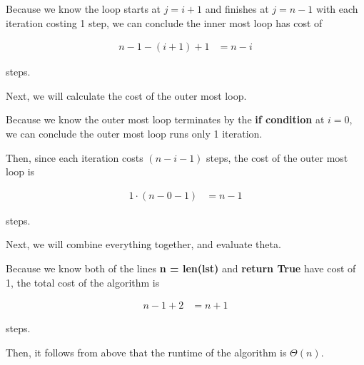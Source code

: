 \documentclass[12pt]{article}
\begin{document}
\begin{enumerate}[a.]
    Because we know the loop starts at $j = i + 1$ and finishes at $j = n-1$ with
    each iteration costing 1 step, we can conclude the inner most loop has cost of

    \setcounter{equation}{0}
    \begin{align}
        n-1-(i+1)+1 &= n-i
    \end{align}

    steps.

    \bigskip

    Next, we will calculate the cost of the outer most loop.

    \bigskip

    Because we know the outer most loop terminates by the \textbf{if condition} at
    $i = 0$, we can conclude the outer most loop runs only 1 iteration.

    \bigskip

    Then, since each iteration costs $(n-i-1)$ steps, the cost of the outer most loop is

    \begin{align}
        1 \cdot (n-0-1) &= n-1
    \end{align}

    steps.

    \bigskip

    Next, we will combine everything together, and evaluate theta.

    \bigskip

    Because we know both of the lines \textbf{n = len(lst)} and \textbf{return True} have cost of 1,
    the total cost of the algorithm is

    \begin{align}
        n - 1 + 2 &= n + 1
    \end{align}

    steps.

    \bigskip

    Then, it follows from above that the runtime of the algorithm is $\Theta(n)$.

\end{enumerate}
\end{document}
